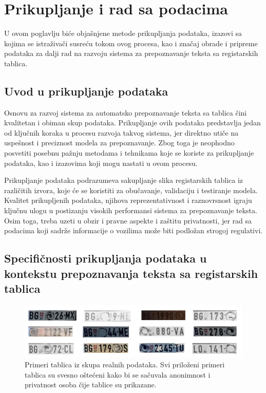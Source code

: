 \documentclass[a4paper,12pt]{article}
\begin{document}
	\section{Prikupljanje i rad sa podacima}
	U ovom poglavlju biće objašnjene metode prikupljanja podataka, izazovi sa kojima se istraživači susreću tokom ovog procesa, kao i značaj obrade i pripreme podataka za dalji rad na razvoju sistema za prepoznavanje teksta sa registarskih tablica.
	
	\subsection{Uvod u prikupljanje podataka}
	Osnovu za razvoj sistema za automatsko prepoznavanje teksta sa tablica čini kvalitetan i obiman skup podataka. Prikupljanje ovih podataka predstavlja jedan od ključnih koraka u procesu razvoja takvog sistema, jer direktno utiče na uspešnost i preciznost modela za prepoznavanje. Zbog toga je neophodno posvetiti posebnu pažnju metodama i tehnikama koje se koriste za prikupljanje podataka, kao i izazovima koji mogu nastati u ovom procesu.
	
	Prikupljanje podataka podrazumeva sakupljanje slika registarskih tablica iz različitih izvora, koje će se koristiti za obučavanje, validaciju i testiranje modela. Kvalitet prikupljenih podataka, njihova reprezentativnost i raznovrsnost igraju ključnu ulogu u postizanju visokih performansi sistema za prepoznavanje teksta. Osim toga, treba uzeti u obzir i pravne aspekte i zaštitu privatnosti, jer rad sa podacima koji sadrže informacije o vozilima može biti podložan strogoj regulativi.
	
	\subsection{Specifičnosti prikupljanja podataka u kontekstu prepoznavanja teksta sa registarskih tablica}
	\begin{figure}[H]
		\centering
		\includegraphics[width=\textwidth]{assets/license-plate-samples.png}
		\caption{Primeri tablica iz skupa realnih podataka. Svi priloženi primeri tablica su svesno oštećeni kako bi se sačuvala anonimnost i privatnost osoba čije tablice su prikazane.}
		\label{fig:license-plate-samples}
	\end{figure}
	
\end{document}
